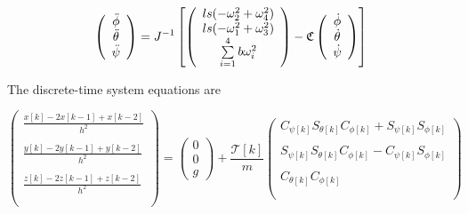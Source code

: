 \begin{equation}
    \left(
        \begin{array}{c}
           \ddot{\phi}\\
           \ddot{\theta}\\
           \ddot{\psi}\\
        \end{array}
    \right) = J^{-1}
    \left[ \left(
        \begin{array}{c}
            l s (-\omega_2^2 + \omega_4^2)\\
            l s (-\omega_1^2 + \omega_3^2)\\
            \sum \limits_{i=1}^4 b \omega_i^2\\
        \end{array}
    \right) -
    \mathfrak{C}
    \left(
        \begin{array}{c}
           \dot{\phi}\\
           \dot{\theta}\\
           \dot{\psi}\\
        \end{array}
    \right)
    \right]
\end{equation}

The discrete-time system equations are

\begin{equation}
    \left(
        \begin{array}{c}
           \frac{x[k] -2 x[k-1] + x[k-2]}{h^2} \\\\
           \frac{y[k] -2 y[k-1] + y[k-2]}{h^2} \\\\
           \frac{z[k] -2 z[k-1] + z[k-2]}{h^2}\\\\
        \end{array}
    \right)
    = \left(
       \begin{array}{c}
        0\\
        0\\
        g
      \end{array}
    \right)
    +\frac{\mathcal{T}[k]}{m}
     \left(
        \begin{array}{c}
             C_{\psi[k]}S_{\theta[k]}C_{\phi[k]} + S_{\psi[k]}S_{\phi[k]} \\\\
             S_{\psi[k]}S_{\theta[k]}C_{\phi[k]} - C_{\psi[k]}S_{\phi[k]} \\\\
             C_{\theta[k]} C_{\phi[k]} \\\\
        \end{array}
    \right)
\end{equation}


